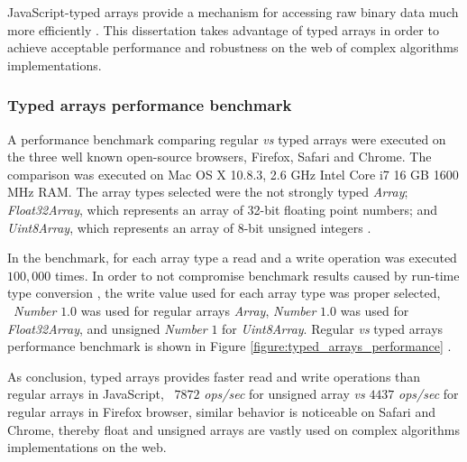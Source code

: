 JavaScript-typed arrays provide a mechanism for accessing raw binary data much more efficiently \cite{MDN2013,TypedArray2013}. This dissertation takes advantage of typed arrays in order to achieve acceptable performance and robustness on the web of complex algorithms implementations.

\subsubsection{Typed arrays performance benchmark} %
\label{subsub:basic_concepts:web:javascript_typed_arrays:typed_arrays_performance_benchmark}

A performance benchmark comparing regular \textit{vs} typed arrays were executed on the three well known open-source browsers, Firefox, Safari and Chrome. The comparison was executed on Mac OS X 10.8.3, 2.6 GHz Intel Core i7 16 GB 1600 MHz RAM. The array types selected were the not strongly typed \textit{Array}; \textit{Float32Array}, which represents an array of 32-bit floating point numbers; and \textit{Uint8Array}, which represents an array of 8-bit unsigned integers \cite{MDN2013}.

In the benchmark, for each array type a read and a write operation was executed $100,000$ times. In order to not compromise benchmark results caused by run-time type conversion \cite{International2009}, the write value used for each array type was proper selected, \eg\ \textit{Number} $1.0$ was used for regular arrays \textit{Array}, \textit{Number} $1.0$ was used for \textit{Float32Array}, and unsigned \textit{Number} $1$ for \textit{Uint8Array}. Regular \textit{vs} typed arrays performance benchmark is shown in Figure \ref{figure:typed_arrays_performance} \cite{TypedArrayPerformance2013}.

As conclusion, typed arrays provides faster read and write operations than regular arrays in JavaScript, \ie\ $7872$ \textit{ops/sec} for unsigned array \textit{vs} $4437$ \textit{ops/sec} for regular arrays in Firefox browser, similar behavior is noticeable on Safari and Chrome, thereby float and unsigned arrays are vastly used on complex algorithms implementations on the web.

